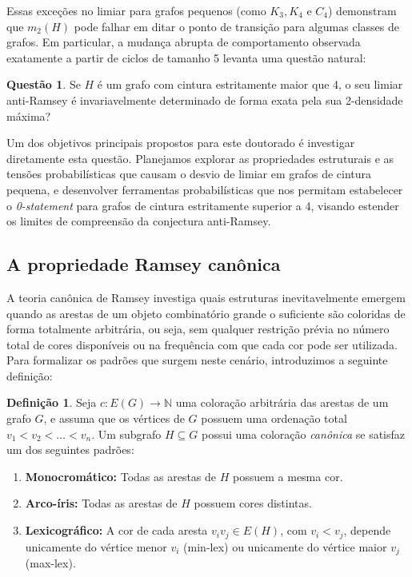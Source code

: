 \documentclass[reqno, 12pt]{amsart}
\numberwithin{equation}{section}
\theoremstyle{definition}
\newtheorem{definition}{Definição}[section]
\newtheorem{question}{Questão}[section]
\theoremstyle{plain}
\begin{document}
Essas exceções no limiar para grafos pequenos (como $K_3, K_4$ e $C_4$) demonstram que $m_2(H)$ pode falhar em ditar o ponto de transição para algumas classes de grafos. Em particular, a mudança abrupta de comportamento observada exatamente a partir de ciclos de tamanho 5 levanta uma questão natural:

\begin{question}
Se $H$ é um grafo com cintura estritamente maior que 4, o seu limiar anti-Ramsey é invariavelmente determinado de forma exata pela sua 2-densidade máxima?
\end{question}

Um dos objetivos principais propostos para este doutorado é investigar diretamente esta questão. Planejamos explorar as propriedades estruturais e as tensões probabilísticas que causam o desvio de limiar em grafos de cintura pequena, e desenvolver ferramentas probabilísticas que nos permitam estabelecer o \emph{0-statement} para grafos de cintura estritamente superior a 4, visando estender os limites de compreensão da conjectura anti-Ramsey.

\subsection{A propriedade Ramsey canônica}

A teoria canônica de Ramsey investiga quais estruturas inevitavelmente emergem quando as arestas de um objeto combinatório grande o suficiente são coloridas de forma totalmente arbitrária, ou seja, sem qualquer restrição prévia no número total de cores disponíveis ou na frequência com que cada cor pode ser utilizada. Para formalizar os padrões que surgem neste cenário, introduzimos a seguinte definição:

\begin{definition}
Seja $c: E(G) \to \mathbb{N}$ uma coloração arbitrária das arestas de um grafo $G$, e assuma que os vértices de $G$ possuem uma ordenação total $v_1 < v_2 < \dots < v_n$. Um subgrafo $H \subseteq G$ possui uma coloração \emph{canônica} se satisfaz um dos seguintes padrões:
\begin{enumerate}
    \item \textbf{Monocromático:} Todas as arestas de $H$ possuem a mesma cor.
    \item \textbf{Arco-íris:} Todas as arestas de $H$ possuem cores distintas.
    \item \textbf{Lexicográfico:} A cor de cada aresta $v_i v_j \in E(H)$, com $v_i < v_j$, depende unicamente do vértice menor $v_i$ (min-lex) ou unicamente do vértice maior $v_j$ (max-lex).
\end{enumerate}
\end{definition}
\end{document}
